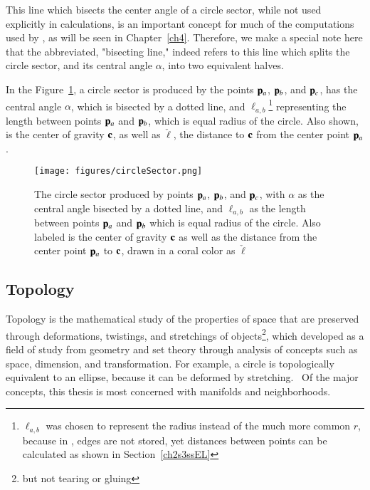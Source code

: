 This line which bisects the center angle of a circle sector, while not used explicitly in calculations, is an important concept for much of the computations used by , as will be seen in Chapter~\ref{ch4}. Therefore, we make a special note here that the abbreviated, "bisecting line," indeed refers to this line which splits the circle sector, and its central angle $\alpha$, into two equivalent halves.%
%

In the Figure~\ref{fig:circleSector}, a circle sector is produced by the points $\mathbf{p}_a$, $\mathbf{p}_b$, and $\mathbf{p}_c$, has the central angle $\alpha$, which is bisected by a dotted line, and $\ell_{a,b}$\footnote{$\ell_{a,b}$ was chosen to represent the radius instead of the much more common $r$, because in \tdd{}, edges are not stored, yet distances between points can be calculated as shown in Section~\ref{ch2s3ssEL}} representing the length between points $\mathbf{p}_a$ and $\mathbf{p}_b$, which is equal radius of the circle. Also shown, is the center of gravity $\mathbf{c}$, as well as $\check{\ell}$, the distance to $\mathbf{c}$ from the center point $\mathbf{p}_a$.

\begin{figure}
\ffigbox
	{\texttt{[image: figures/circleSector.png]}}
	{\caption[A Circle Sector in Detail]{The circle sector produced by points $\mathbf{p}_a$, $\mathbf{p}_b$, and $\mathbf{p}_c$, with $\alpha$ as the central angle bisected by a dotted line, and $\ell_{a,b}$ as the length between points $\mathbf{p}_a$ and $\mathbf{p}_b$ which is equal radius of the circle. Also labeled is the center of gravity $\mathbf{c}$ as well as the distance from the center point $\mathbf{p}_a$ to $\mathbf{c}$, drawn in a coral color as $\check{\ell}$}\label{fig:circleSector}}
\end{figure}

%
%
%
\subsection{Topology}
\label{ch2sBssT}
Topology is the mathematical study of the properties of space that are preserved through deformations, twistings, and stretchings of objects\footnote{but not tearing or gluing}, which developed as a field of study from geometry and set theory through analysis of concepts such as space, dimension, and transformation. For example, a circle is topologically equivalent to an ellipse, because it can be deformed by stretching.~\cite{Weisstein19c} Of the major concepts, this thesis is most concerned with manifolds and neighborhoods.

